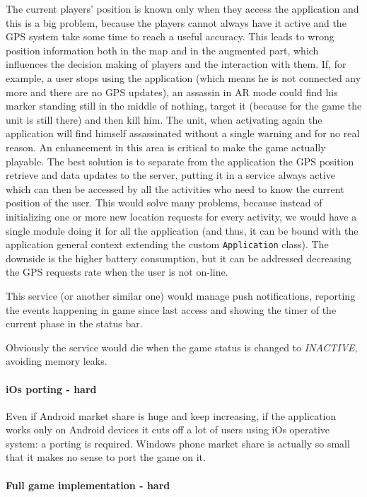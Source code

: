 	The current players' position is known only when they access the application and this is a big problem, because the players cannot always have it active and the GPS system take some time to reach a useful accuracy. This leads to wrong position information both in the map and in the augmented part, which influences the decision making of players and the interaction with them. If, for example, a user stops using the application (which means he is not connected any more and there are no GPS updates), an assassin in AR mode could find his marker standing still in the middle of nothing, target it (because for the game the unit is still there) and then kill him. The unit, when activating again the application will find himself assassinated without a single warning and for no real reason. An enhancement in this area is critical to make the game actually playable. The best solution is to separate from the application the GPS position retrieve and data updates to the server, putting it in a service always active which can then be accessed by all the activities who need to know the current position of the user.
	This would solve many problems, because instead of initializing one or more new location requests for every activity, we would have a single module doing it for all the application (and thus, it can be bound with the application general context extending the custom \lstinline|Application| class).
	The downside is the higher battery consumption, but it can be addressed decreasing the GPS requests rate when the user is not on-line.
		
	This service (or another similar one) would manage push notifications, reporting the events happening in game since last access and showing the timer of the current phase in the status bar.
		
	Obviously the service would die when the game status is changed to \emph{INACTIVE}, avoiding memory leaks.
	
	\paragraph{iOs porting - hard}
	
	Even if Android market share is huge and keep increasing, if the application works only on Android devices it  cuts off a lot of users using iOs operative system: a porting is required. Windows phone market share is actually so small that it makes no sense to port the game on it.
	
	\paragraph{Full game implementation - hard}
		
